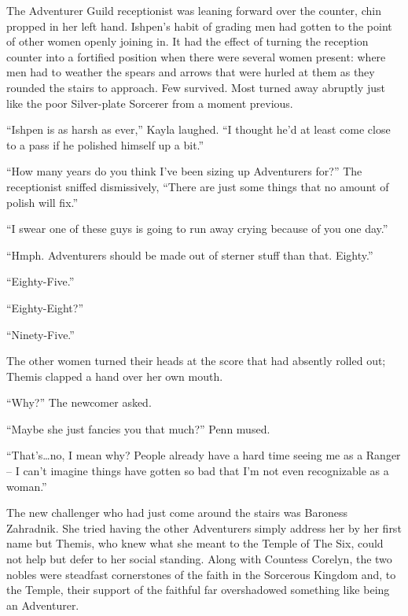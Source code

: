  

The Adventurer Guild receptionist was leaning forward over the counter, chin propped in her left hand. Ishpen’s habit of grading men had gotten to the point of other women openly joining in. It had the effect of turning the reception counter into a fortified position when there were several women present: where men had to weather the spears and arrows that were hurled at them as they rounded the stairs to approach. Few survived. Most turned away abruptly just like the poor Silver-plate Sorcerer from a moment previous.

 

“Ishpen is as harsh as ever,” Kayla laughed. “I thought he’d at least come close to a pass if he polished himself up a bit.”

 

“How many years do you think I’ve been sizing up Adventurers for?” The receptionist sniffed dismissively, “There are just some things that no amount of polish will fix.”

 

“I swear one of these guys is going to run away crying because of you one day.”

 

“Hmph. Adventurers should be made out of sterner stuff than that. Eighty.”

 

“Eighty-Five.”

 

“Eighty-Eight?”

 

“Ninety-Five.”

 

The other women turned their heads at the score that had absently rolled out; Themis clapped a hand over her own mouth.

 

“Why?” The newcomer asked.

 

“Maybe she just fancies you that much?” Penn mused.

 

“That’s…no, I mean why? People already have a hard time seeing me as a Ranger – I can’t imagine things have gotten so bad that I’m not even recognizable as a woman.”

 

The new challenger who had just come around the stairs was Baroness Zahradnik. She tried having the other Adventurers simply address her by her first name but Themis, who knew what she meant to the Temple of The Six, could not help but defer to her social standing. Along with Countess Corelyn, the two nobles were steadfast cornerstones of the faith in the Sorcerous Kingdom and, to the Temple, their support of the faithful far overshadowed something like being an Adventurer.

